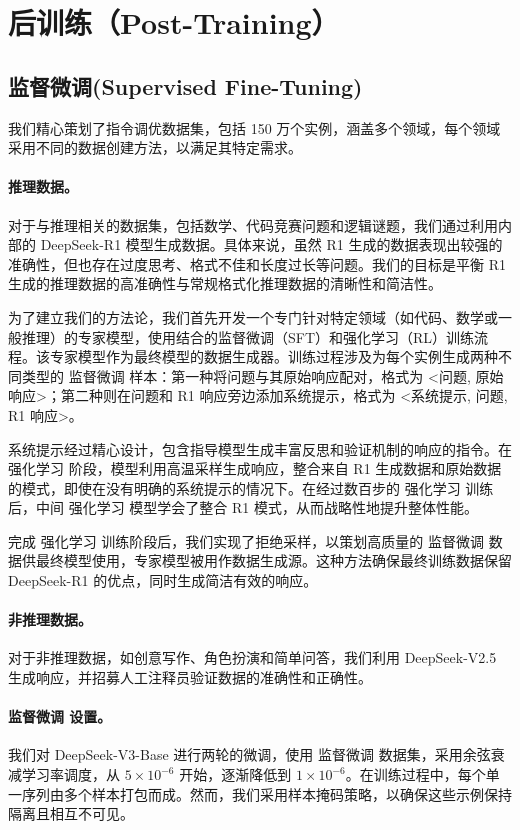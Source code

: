 \documentclass[lang=cn,a4paper,newtx]{elegantpaper}
\newcommand{\dsviii}{DeepSeek-V3}
\begin{document}
\section{后训练（Post-Training）}
\label{sec:alignment}

\subsection{监督微调(Supervised Fine-Tuning)}

我们精心策划了指令调优数据集，包括 150 万个实例，涵盖多个领域，每个领域采用不同的数据创建方法，以满足其特定需求。

\paragraph{推理数据。}
对于与推理相关的数据集，包括数学、代码竞赛问题和逻辑谜题，我们通过利用内部的 DeepSeek-R1 模型生成数据。具体来说，虽然 R1 生成的数据表现出较强的准确性，但也存在过度思考、格式不佳和长度过长等问题。我们的目标是平衡 R1 生成的推理数据的高准确性与常规格式化推理数据的清晰性和简洁性。

为了建立我们的方法论，我们首先开发一个专门针对特定领域（如代码、数学或一般推理）的专家模型，使用结合的监督微调（SFT）和强化学习（RL）训练流程。该专家模型作为最终模型的数据生成器。训练过程涉及为每个实例生成两种不同类型的 监督微调 样本：第一种将问题与其原始响应配对，格式为 <问题, 原始响应>；第二种则在问题和 R1 响应旁边添加系统提示，格式为 <系统提示, 问题, R1 响应>。

系统提示经过精心设计，包含指导模型生成丰富反思和验证机制的响应的指令。在 强化学习 阶段，模型利用高温采样生成响应，整合来自 R1 生成数据和原始数据的模式，即使在没有明确的系统提示的情况下。在经过数百步的 强化学习 训练后，中间 强化学习 模型学会了整合 R1 模式，从而战略性地提升整体性能。

完成 强化学习 训练阶段后，我们实现了拒绝采样，以策划高质量的 监督微调 数据供最终模型使用，专家模型被用作数据生成源。这种方法确保最终训练数据保留 DeepSeek-R1 的优点，同时生成简洁有效的响应。

\paragraph{非推理数据。}
对于非推理数据，如创意写作、角色扮演和简单问答，我们利用 DeepSeek-V2.5 生成响应，并招募人工注释员验证数据的准确性和正确性。

\paragraph{监督微调 设置。}
我们对 \dsviii{}-Base 进行两轮的微调，使用 监督微调 数据集，采用余弦衰减学习率调度，从 $5 \times 10^{-6}$ 开始，逐渐降低到 $1 \times 10^{-6}$。在训练过程中，每个单一序列由多个样本打包而成。然而，我们采用样本掩码策略，以确保这些示例保持隔离且相互不可见。
\end{document}
